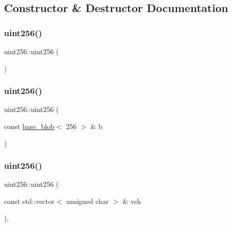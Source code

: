 \subsection{Constructor \& Destructor Documentation}
\mbox{\label{classuint256_aca0c2c2c61e453717e72a4eaec71168f}} 
\subsubsection{\texorpdfstring{uint256()}{uint256()}\hspace{0.1cm}{\footnotesize\ttfamily [1/3]}}
{\footnotesize\ttfamily uint256\+::uint256 (\begin{DoxyParamCaption}{ }\end{DoxyParamCaption})\hspace{0.3cm}{\ttfamily [inline]}}

\mbox{\label{classuint256_a01460091171cf2b82b9e41cdb0326bed}} 
\subsubsection{\texorpdfstring{uint256()}{uint256()}\hspace{0.1cm}{\footnotesize\ttfamily [2/3]}}
{\footnotesize\ttfamily uint256\+::uint256 (\begin{DoxyParamCaption}\item[{const \mbox{\hyperlink{classbase__blob}{base\+\_\+blob}}$<$ 256 $>$ \&}]{b }\end{DoxyParamCaption})\hspace{0.3cm}{\ttfamily [inline]}}

\mbox{\label{classuint256_a7cad0fc486ebc2ed02462d5a7d4e4f2d}} 
\subsubsection{\texorpdfstring{uint256()}{uint256()}\hspace{0.1cm}{\footnotesize\ttfamily [3/3]}}
{\footnotesize\ttfamily uint256\+::uint256 (\begin{DoxyParamCaption}\item[{const std\+::vector$<$ unsigned char $>$ \&}]{vch }\end{DoxyParamCaption})\hspace{0.3cm}{\ttfamily [inline]}, {\ttfamily [explicit]}}



